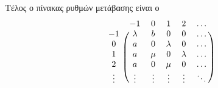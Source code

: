 \documentclass[a4paper,11pt]{article}
\begin{document}
Τέλος ο πίνακας ρυθμών μετάβασης είναι ο
\[
	\begin{blockarray}{cccccc}
		& -1 & 0 & 1 & 2 & \dots \\
		\begin{block}{c(ccccc)}
			-1 & \lambda & b & 0 & 0 & \dots \\
			0 & a & 0 & \lambda & 0 & \dots \\
			1 & a & \mu & 0 & \lambda & \dots \\
			2 & a & 0 & \mu & 0 & \dots \\
			\vdots & \vdots & \vdots & \vdots & \vdots & \ddots \\
		\end{block}
	\end{blockarray}
\]
	
\end{document}
